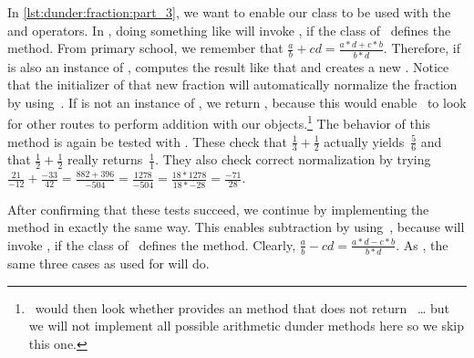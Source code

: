 %
%
%
%
\afterpage{\clearpage}

In \cref{lst:dunder:fraction:part_3}, we want to enable our  class to be used with the \pythonil{+} and \pythonil{-} operators.
In \python, doing something like  will invoke , if the class of~ defines the  method.
From primary school, we remember that $\frac{a}{b}+{c}{d} = \frac{a*d+c*b}{b*d}$.
Therefore, if  is also an instance of ,  computes the result like that and creates a new .
Notice that the initializer of that new fraction will automatically normalize the fraction by using~.
If  is not an instance of , we return , because this would enable \python\ to look for other routes to perform addition with our objects.\footnote{%
\python\ would then look whether  provides an  method that does not return~ {\dots} but we will not implement all possible arithmetic dunder methods here so we skip this one.%
}%
The behavior of this method is again be tested with .
These check that $\frac{1}{3} + \frac{1}{2}$ actually yields~$\frac{5}{6}$ and that $\frac{1}{2}+\frac{1}{2}$ really returns~$\frac{1}{1}$.
They also check correct normalization by trying~$\frac{21}{-12}+\frac{-33}{42}=\frac{882+396}{-504}=\frac{1278}{-504}=\frac{18*1278}{18*-28}=\frac{-71}{28}$.

After confirming that these tests succeed, we continue by implementing the  method in exactly the same way.
This enables subtraction by using~\pythonilIdx{-}, because  will invoke , if the class of~ defines the  method.
Clearly, $\frac{a}{b}-{c}{d} = \frac{a*d-c*b}{b*d}$.
As , the same three cases as used for  will do.

